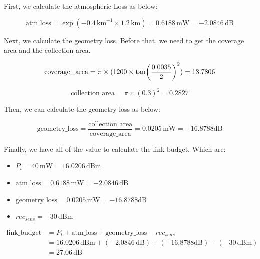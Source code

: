 \documentclass[12pt]{article}
\begin{document}
First, we calculate the atmospheric Loss as below:

    \begin{equation}
    \text{atm\_loss} = \exp(-0.4\, \text{km}^{-1} \times 1.2\, \text{km}) = 0.6188\, \text{mW} = -2.0846\, \text{dB}
    \end{equation}

Next, we calculate the geometry loss. Before that, we need to get the coverage area and the collection area.

    \begin{equation}
    \text{coverage\_area} = \pi \times (1200 \times \tan(\frac{0.0035}{2})^2) \\
    = 13.7806
    \end{equation}

    \begin{equation}
    \text{collection\_area} = \pi \times (0.3)^2 = 0.2827
    \end{equation}

Then, we can calculate the geometry loss as below:

    \begin{equation}
    \text{geometry\_loss} = \frac{\text{collection\_area}}{\text{coverage\_area}} = 0.0205\, \text{mW} = -16.8788 \text{dB}
    \end{equation}

Finally, we have all of the value to calculate the link budget. Which are:
    \begin{itemize}
        \item $P_{t} = 40\, \text{mW} = 16.0206\, \text{dBm}$
        \item $\text{atm\_loss} = 0.6188\, \text{mW} = -2.0846\, \text{dB}$
        \item $\text{geometry\_loss} = 0.0205\, \text{mW} = -16.8788 \text{dB}$
        \item $\textit{rec}_{sens} = -30\, \text{dBm}$
    \end{itemize}

    \begin{equation}
        \begin{split}
            \text{link\_budget} &= P_{t} + \text{atm\_loss} + \text{geometry\_loss} - \textit{rec}_{sens} \\
            &= 16.0206\, \text{dBm} + (-2.0846\, \text{dB}) + (-16.8788 \text{dB}) - (-30\, \text{dBm}) \\
            &= 27.06\, \text{dB}
        \end{split}
    \end{equation}
\end{document}
